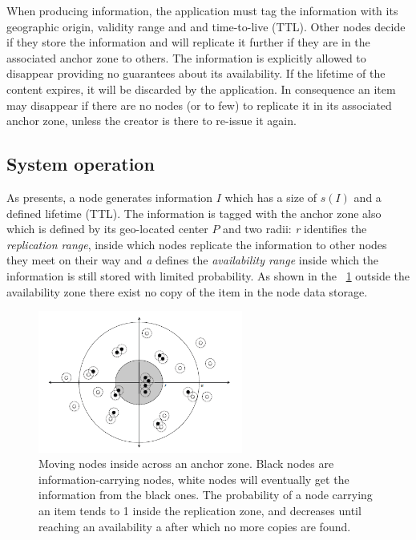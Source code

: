 When producing information, the application must tag the information with its
geographic origin, validity range and and time-to-live (TTL).
Other nodes decide if they store the information and will replicate it further
if they are in the associated anchor zone to others. The information is
explicitly allowed to disappear providing no guarantees about its availability.
If the lifetime of the content expires, it will be discarded by the application.
In consequence an item may disappear if there are no nodes (or to few) to
replicate it in its associated anchor zone, unless the creator is there to
re-issue it again.

\subsection{System operation}

As \cite{percomfloatingcontent} presents, a node generates information $I$ which
has a size of $s(I)$ and a defined lifetime (TTL). The information is tagged
with the anchor zone also which is defined by its geo-located center $P$ and two
radii: {\it r} identifies the {\it replication range}, inside which nodes
replicate the information to other nodes they meet on their way and {\it a}
defines the {\it availability range} inside which the information is still
stored with limited probability. As shown in the ~\ref{fig:anchor_zone} outside
the availability zone there exist no copy of the item in the node data storage.

\begin{figure}[bt]
 \centering
 \includegraphics[width=0.6\textwidth]{img/anchor_zone}
 \caption{Moving nodes inside across an anchor zone. Black nodes are
 information-carrying nodes, white nodes will eventually get the information
 from the black ones. The probability of a node carrying an item tends to 1
 inside the replication zone, and decreases until reaching an availability a
 after which no more copies are found. }
 \label{fig:anchor_zone}
\end{figure}

